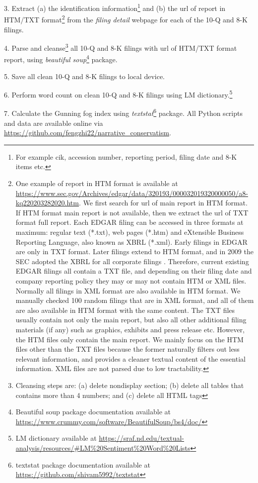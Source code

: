 3. Extract (a) the identification information\footnote{For example cik, accession number, reporting period, filing date and 8-K items etc.} and (b) the url of report in HTM/TXT format\footnote{One example of report in HTM format is available at \url{https://www.sec.gov/Archives/edgar/data/320193/000032019320000050/a8-kq220203282020.htm}. We first search for url of main report in HTM format. If HTM format main report is not available, then we extract the url of TXT format full report. Each EDGAR filing can be accessed in three formats at maximum: regular text (*.txt), web pages (*.htm) and eXtensible Business Reporting Language, also known as XBRL (*.xml). Early filings in EDGAR are only in TXT format. Later filings extend to HTM format, and in 2009 the SEC adopted the XBRL for all corporate filings \cite{secFinalRuleInteractive2009}. Therefore, current existing EDGAR filings all contain a TXT file, and depending on their filing date and company reporting policy they may or may not contain HTM or XML files. Normally all filings in XML format are also available in HTM format. We manually checked 100 random filings that are in XML format, and all of them are also available in HTM format with the same content. The TXT files usually contain not only the main report, but also all other additional filing materials (if any) such as graphics, exhibits and press release etc. However, the HTM files only contain the main report. We mainly focus on the HTM files other than the TXT files because the former naturally filters out less relevant information, and provides a cleaner textual content of the essential information. XML files are not parsed due to low tractability. } from the \textit{filing detail} webpage for each of the 10-Q and 8-K filings. 

4. Parse and cleanse\footnote{Cleansing steps are: (a) delete nondisplay section; (b) delete all tables that contains more than 4 numbers; and (c) delete all HTML tags} all 10-Q and 8-K filings with url of HTM/TXT format report, using \textit{beautiful soup}\footnote{Beautiful soup package documentation available at \url{https://www.crummy.com/software/BeautifulSoup/bs4/doc/}} package. 

5. Save all clean 10-Q and 8-K filings to local device. 

6. Perform word count on clean 10-Q and 8-K filings using LM dictionary.\footnote{LM dictionary available at \url{https://sraf.nd.edu/textual-analysis/resources/\#LM\%20Sentiment\%20Word\%20Lists}}

7. Calculate the Gunning fog index using \textit{textstat}\footnote{textstat package documentation available at \url{https://github.com/shivam5992/textstat}} package. 
\newline
All Python scripts and data are available online via \url{https://github.com/fengzhi22/narrative_conservatism}.